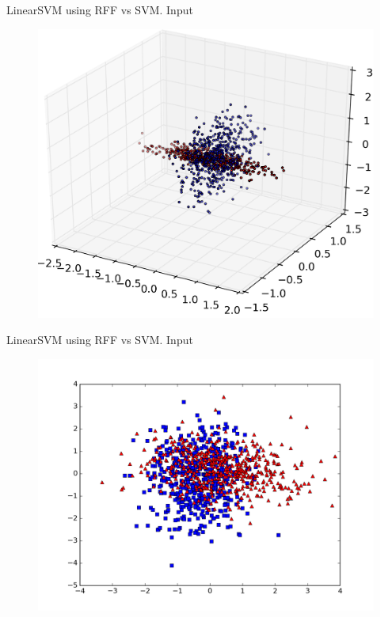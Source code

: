 \documentclass[unknownkeysallowed]{beamer}
\begin{document}
\begin{frame}{LinearSVM using RFF vs SVM. Input}
\begin{figure}
\includegraphics[scale=0.145]{img/svm_tm_n10_N131072_k10--3d_copy}
\end{figure}
\end{frame}

\begin{frame}[noframenumbering]{LinearSVM using RFF vs SVM. Input}
\begin{figure}
\includegraphics[scale=0.45]{img/svm_tm_n5_N131072_k3--2d_}
\end{figure}
\end{frame}
\end{document}
